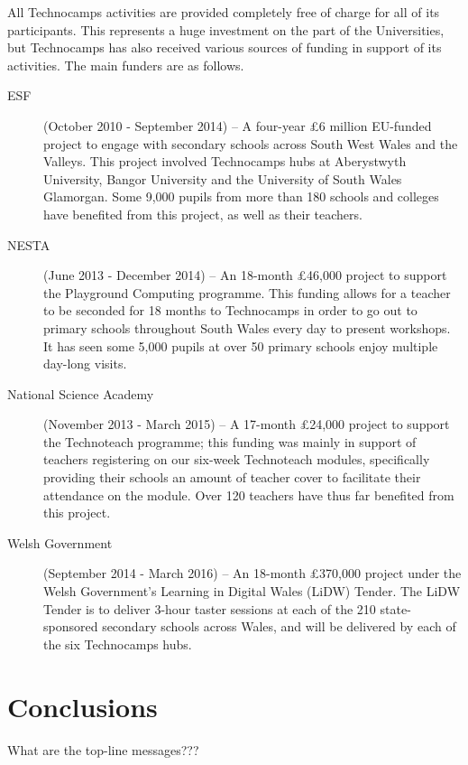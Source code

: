 \documentclass{sig-alternate}
\begin{document}
All Technocamps activities are provided completely free of charge
for all of its participants. This represents a huge investment
on the part of the Universities, but Technocamps has also received
various sources of funding in support of its activities.
The main funders are as follows.
\begin{description}
\item[ESF] (October 2010 - September 2014) --
A four-year \pounds 6 million EU-funded project to engage with secondary schools across South West Wales and the Valleys. This project involved Technocamps hubs at Aberystwyth University, Bangor University and the University of South Wales Glamorgan. Some 9,000 pupils from more than 180 schools and colleges have benefited from this project, as well as their teachers.
\item[NESTA] (June 2013 - December 2014) --
An 18-month \pounds 46,000 project to support the Playground Computing programme. This funding allows for a teacher to be seconded for 18 months to Technocamps in order to go out to primary schools throughout South Wales every day to present workshops. It has seen some 5,000 pupils at over 50 primary schools enjoy multiple day-long visits.
\item[National Science Academy] (November 2013 - March 2015) --
A 17-month \pounds 24,000 project to support the Technoteach programme; this funding was mainly in support of teachers registering on our six-week Technoteach modules, specifically providing their schools an amount of teacher cover to facilitate their attendance on the module. Over 120 teachers have thus far benefited from this project.
\item[Welsh Government] (September 2014 - March 2016) --
An 18-month \pounds 370,000 project under the Welsh Government's Learning in Digital Wales (LiDW) Tender. The LiDW Tender is to deliver 3-hour taster sessions at each of the 210 state-sponsored secondary schools across Wales, and will be delivered by each of the six Technocamps hubs.
\end{description}

\section{Conclusions}
What are the top-line messages???



\end{document}
